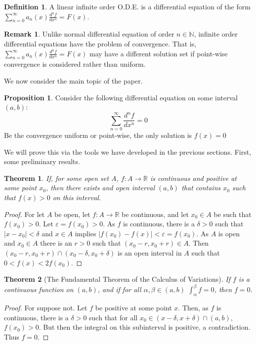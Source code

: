 \documentclass[oneside]{book}
\newtheorem{theorem}{Theorem}[section]
\theoremstyle{definition}
\newtheorem{definition}{Definition}[section]
\newtheorem{proposition}{Proposition}[section]
\newtheorem{remark}{Remark}[section]
\begin{document}
\begin{definition}
A linear infinite order O.D.E. is a differential equation of the form $\sum_{n=0}^{\infty} a_n(x) \frac{d^n f}{dx^n} = F(x)$.
\end{definition}

\begin{remark}
Unlike normal differential equation of order $n\in \mathbb{N}$, infinite order differential equations have the problem of convergence. That is, $\sum_{n=0}^{\infty} a_n(x) \frac{d^n f}{dx^n} = F(x)$ may have a different solution set if point-wise convergence is considered rather than uniform.
\end{remark}

We now consider the main topic of the paper.

\begin{proposition}
Consider the following differential equation on some interval $(a,b)$:
\begin{equation}
\nonumber \sum_{n=0}^{\infty} \frac{d^n f}{dx^n} = 0
\end{equation}
Be the convergence uniform or point-wise, the only solution is $f(x)=0$
\end{proposition}

We will prove this via the tools we have developed in the previous sections. First, some preliminary results.

\begin{theorem}
If, for some open set $A$, $f:A\rightarrow \mathbb{R}$ is continuous and positive at some point $x_0$, then there exists and open interval $(a,b)$ that contains $x_0$ such that $f(x)>0$ on this interval.
\end{theorem}
\begin{proof}
For let $A$ be open, let $f:A\rightarrow \mathbb{R}$ be continuous, and let $x_0\in A$ be such that $f(x_0)>0$. Let $\varepsilon = f(x_0)>0$. As $f$ is continuous, there is a $\delta>0$ such that $|x-x_0|<\delta$ and $x\in A$ implies $|f(x_0)-f(x)|<\varepsilon = f(x_0)$. As $A$ is open and $x_0\in A$ there is an $r>0$ such that $(x_0-r,x_0+r)\in A$. Then $(x_0-r,x_0+r)\cap (x_0-\delta,x_0+\delta)$ is an open interval in $A$ such that $0<f(x)<2f(x_0)$.
\end{proof}

\begin{theorem}[The Fundamental Theorem of the Calculus of Variations]
If $f$ is a continuous function on $(a,b)$, and if for all $\alpha,\beta\in (a,b)$ $\int_{\alpha}^{\beta}f = 0$, then $f=0$.
\end{theorem}
\begin{proof}
For suppose not. Let $f$ be positive at some point $x$. Then, as $f$ is continuous, there is a $\delta>0$ such that for all $x_0\in (x-\delta,x+\delta)\cap(a,b)$, $f(x_0)>0$. But then the integral on this subinterval is positive, a contradiction. Thus $f=0$.
\end{proof}
\end{document}
